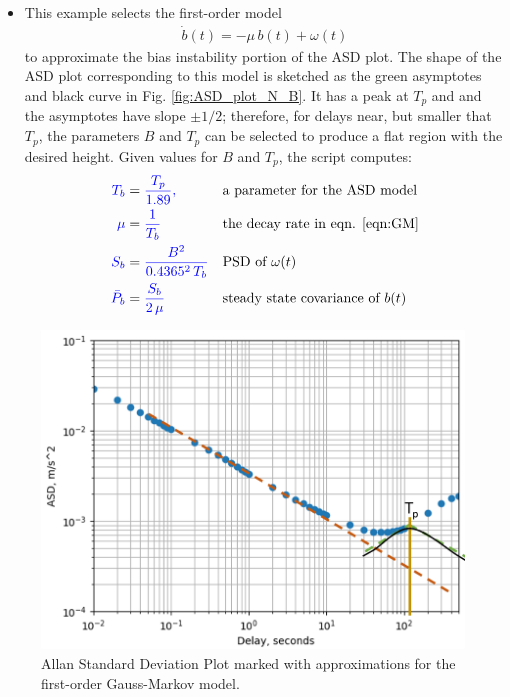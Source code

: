 \documentclass[letter,twocolumn]{article}
\begin{document}
\begin{enumerate}
\begin{itemize}
		\item This example selects the first-order model 
		\begin{align} \label{eqn:GM}
			\dot{b}(t) = -\mu \, b(t) + \omega(t)
		\end{align}
		to approximate the bias instability portion of the ASD plot. 
		The shape of the ASD plot corresponding to this model is sketched as the green asymptotes and black curve in Fig. \ref{fig:ASD_plot_N_B}. 
		It has a peak at $T_p$ and and the asymptotes have slope $\pm 1/2$;
		therefore, for delays near, but smaller that $T_p$, the parameters $B$ and $T_p$ can be selected to produce a flat region with the desired height. 
		Given values for $B$ and $T_p$, the script computes:
		\begin{align*}
		\color{blue} T_b &= \color{blue} \frac{T_p}{1.89}, \color{black} && \mbox{a parameter for the ASD model} \\
		\color{blue} \mu &= \color{blue}\frac{1}{T_b} \color{black}  && \mbox{the decay rate in eqn. \eqref{eqn:GM}} \\
		\color{blue} S_b &= \color{blue}\frac{B^2}{0.4365^2\,T_b} \color{black} && \mbox{PSD of } \omega(t) \\
		\color{blue} \bar{P}_b & = \color{blue}\frac{S_b}{2\,\mu} \color{black} && \mbox{steady state covariance of } b(t) 
		\end{align*}
	\end{itemize}

\end{enumerate}

\begin{figure}[tbh]
	\centering
	\includegraphics[trim=0in 0in 0in 0.1in, clip, width=0.8\columnwidth]{figure/ASD_plot_B_GM}
	\caption{Allan Standard Deviation Plot marked with approximations for the first-order Gauss-Markov model. }
	\label{fig:ASD_plot_B_GM}
\end{figure}
\end{document}
